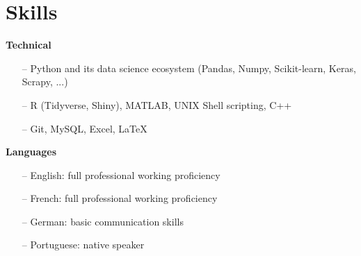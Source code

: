 \section{Skills} 

{\bf Technical} \\
\begin{itemize}
	\item[--] Python and its data science ecosystem (Pandas, Numpy, Scikit-learn, Keras, Scrapy, ...)
	\item[--] R (Tidyverse, Shiny), MATLAB, UNIX Shell scripting, C++
	\item[--] Git, MySQL, Excel, \LaTeX
\end{itemize}

{\bf Languages} \\
\begin{itemize}
	\item[--] English: full professional working proficiency
	\item[--] French: full professional working proficiency
	\item[--] German: basic communication skills
	\item[--] Portuguese: native speaker
\end{itemize}